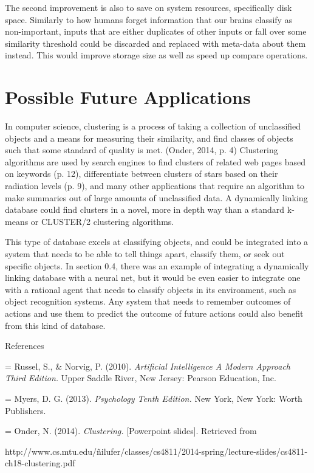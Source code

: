 \documentclass{report}
\begin{document}
The second improvement is also to save on system resources, specifically disk space. Similarly to how humans forget information that our brains classify as non-important, inputs that are either duplicates of other inputs or fall over some similarity threshold could be discarded and replaced with meta-data about them instead. This would improve storage size as well as speed up compare operations.

\section{Possible Future Applications}
In computer science, clustering is a process of taking a collection of unclassified objects and a means for measuring their similarity, and find classes of objects such that some standard of quality is met. (Onder, 2014, p. 4) Clustering algorithms are used by search engines to find clusters of related web pages based on keywords (p. 12), differentiate between clusters of stars based on their radiation levels (p. 9), and many other applications that require an algorithm to make summaries out of large amounts of unclassified data. A dynamically linking database could find clusters in a novel, more in depth way than a standard k-means or CLUSTER/2 clustering algorithms. 

This type of database excels at classifying objects, and could be integrated into a system that needs to be able to tell things apart, classify them, or seek out specific objects. In section 0.4, there was an example of integrating a dynamically linking database with a neural net, but it would be even easier to integrate one with a rational agent that needs to classify objects in its environment, such as object recognition systems. Any system that needs to remember outcomes of actions and use them to predict the outcome of future actions could also benefit from this kind of database. 

\newpage
\begin{center}
References
\end{center} 

\hangindent=\parindent
{}
\noindent
Russel, S., \& Norvig, P. (2010). \textit{Artificial Intelligence A Modern Approach Third Edition.} Upper Saddle River, New Jersey: Pearson Education, Inc.
\noindent

\hangindent=\parindent
{}
\noindent
Myers, D. G. (2013). \textit{Psychology Tenth Edition.} New York, New York: Worth Publishers.
\noindent

\hangindent=\parindent
{}
\noindent
Onder, N. (2014). \textit{Clustering.} [Powerpoint slides]. Retrieved from 

http://www.cs.mtu.edu/\~nilufer/classes/cs4811/2014-spring/lecture-slides/cs4811-ch18-clustering.pdf
\noindent
\end{document}
